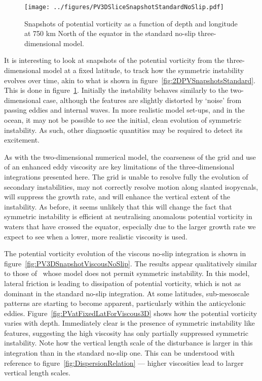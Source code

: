 \begin{figure} 
    \centering
    \texttt{[image: ../figures/PV3DSliceSnapshotStandardNoSlip.pdf]}
    \caption{Snapshots of potential vorticity as a function of depth and longitude at 750 km  North of the equator in the standard no-slip three-dimensional model.}
    \label{fig:PVatFixedLatStandardNoSlip3D}
\end{figure}

It is interesting to look at snapshots of the potential vorticity from the three-dimensional model at a fixed latitude, to track how the symmetric instability evolves over time, akin to what is shown in figure~\ref{fig:2DPVSnapshotsStandard}. This is done in figure~\ref{fig:PVatFixedLatStandardNoSlip3D}. Initially the instability behaves similarly to the two-dimensional case, although the features are slightly distorted by `noise' from passing eddies and internal waves. In more realistic model set-ups, and in the ocean, it may not be possible to see the initial, clean evolution of symmetric instability. As such, other diagnostic quantities may be required to detect its excitement.

As with the two-dimensional numerical model, the coarseness of the grid and use of an enhanced eddy viscosity are key limitations of the three-dimensional integrations presented here. The grid is unable to resolve fully the evolution of secondary instabilities, may not correctly resolve motion along slanted isopycnals, will suppress the growth rate, and will enhance the vertical extent of the instability. As before, it seems unlikely that this will change the fact that symmetric instability is efficient at neutralising anomalous potential vorticity in waters that have crossed the equator, especially due to the larger growth rate we expect to see when a lower, more realistic viscosity is used.

The potential vorticity evolution of the viscous no-slip integration is shown in figure~\ref{fig:PV3DSnapshotViscousNoSlip}. The results appear qualitatively similar to those of~\citet{Edwards1998I} whose model does not permit symmetric instability. In this model, lateral friction is leading to dissipation of potential vorticity, which is not as dominant in the standard no-slip integration. At some latitudes, sub-mesoscale patterns are starting to become apparent, particularly within the anticyclonic eddies. Figure~\ref{fig:PVatFixedLatForViscous3D} shows how the potential vorticity varies with depth. Immediately clear is the presence of symmetric instability like features, suggesting the high viscosity has only partially suppressed symmetric instability. Note how the vertical length scale of the disturbance is larger in this integration than in the standard no-slip one. This  can be understood with reference to figure~\ref{fig:DispersionRelation} --- higher viscosities lead to larger vertical length scales.

